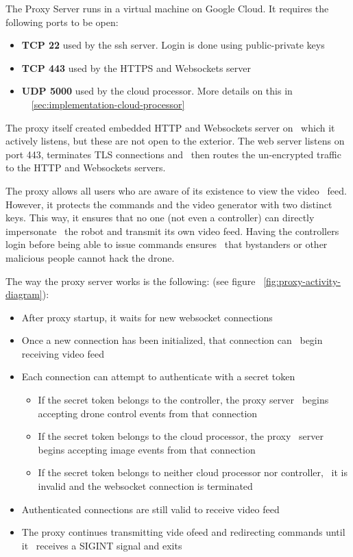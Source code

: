 The Proxy Server runs in a virtual machine on Google Cloud.
It requires the following ports to be open:
\begin{itemize}
    \item \textbf{TCP 22} used by the ssh server. Login is done using public-private keys
    \item \textbf{TCP 443} used by the HTTPS and Websockets server
    \item \textbf{UDP 5000} used by the cloud processor. More details on this in \
            ~\ref{sec:implementation-cloud-processor}
\end{itemize}
The proxy itself created embedded HTTP and Websockets server on \
which it actively listens, but these are not open to the exterior.
The web server listens on port 443, terminates TLS connections and \
then routes the un-encrypted traffic to the HTTP and Websockets servers.

The proxy allows all users who are aware of its existence to view the video \
feed.
However, it protects the commands and the video generator with two distinct keys.
This way, it ensures that no one (not even a controller) can directly impersonate \
the robot and transmit its own video feed.
Having the controllers login before being able to issue commands ensures \
that bystanders or other malicious people cannot hack the drone.

The way the proxy server works is the following: (see figure ~\ref{fig:proxy-activity-diagram}):
\begin{itemize}
    \item After proxy startup, it waits for new websocket connections
    \item Once a new connection has been initialized, that connection can \
            begin receiving video feed
    \item Each connection can attempt to authenticate with a secret token
        \begin{itemize}
            \item If the secret token belongs to the controller, the proxy server \
                    begins accepting drone control events from that connection
            \item If the secret token belongs to the cloud processor, the proxy \
                    server begins accepting image events from that connection
            \item If the secret token belongs to neither cloud processor nor controller, \
                    it is invalid and the websocket connection is terminated
        \end{itemize}
    \item Authenticated connections are still valid to receive video feed
    \item The proxy continues transmitting vide ofeed and redirecting commands until it \
            receives a SIGINT signal and exits
\end{itemize}


